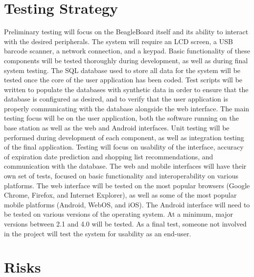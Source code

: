 \documentclass[11pt]{article} %
\begin{document}
\section{Testing Strategy}
Preliminary testing will focus on the BeagleBoard itself and its ability to interact with the desired peripherals.  The system will require an LCD screen, a USB barcode scanner, a network connection, and a keypad.  Basic functionality of these components will be tested thoroughly during development, as well as during final system testing. 
\newline \quad \newline
The SQL database used to store all data for the system will be tested once the core of the user application has been coded.  Test scripts will be written to populate the databases with synthetic data in order to ensure that the database is configured as desired, and to verify that the user application is properly communicating with the database alongside the web interface.
\newline \quad \newline
The main testing focus will be on the user application, both the software running on the base station as well as the web and Android interfaces.  Unit testing will be performed during development of each component, as well as integration testing of the final application.  Testing will focus on usability of the interface, accuracy of expiration date prediction and shopping list recommendations, and communication with the database. 
\newline \quad \newline
The web and mobile interfaces will have their own set of tests, focused on basic functionality and interoperability on various platforms.  The web interface will be tested on the most popular browsers (Google Chrome, Firefox, and Internet Explorer), as well as some of the most popular mobile platforms (Android, WebOS, and iOS).  The Android interface will need to be tested on various versions of the operating system.  At a minimum, major versions between 2.1 and 4.0 will be tested.  
\newline \quad \newline
As a final test, someone not involved in the project will test the system for usability as an end-user.

\section{Risks}
\end{document}

